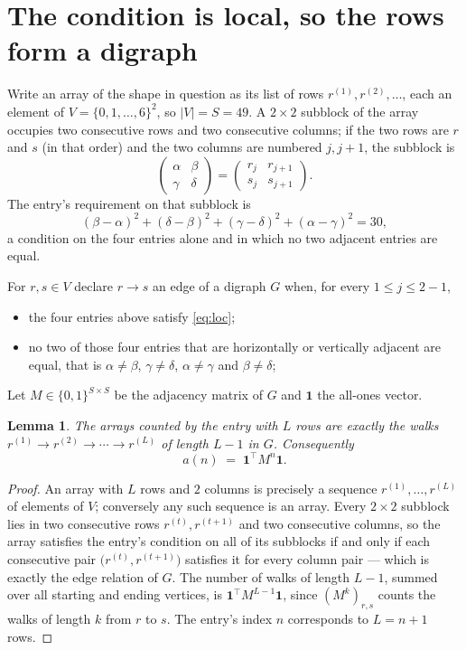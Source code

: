 \documentclass[11pt,a4paper]{article}
\theoremstyle{plain}
\newtheorem{lemma}[theorem]{Lemma}
\theoremstyle{definition}
\begin{document}
\section{The condition is local, so the rows form a digraph}

Write an array of the shape in question as its list of rows
$r^{(1)},r^{(2)},\dots$, each an element of
$V=\{0,1,\dots,6\}^{2}$, so $|V|=S=49$. A $2\times2$ subblock of the array
occupies two consecutive rows and two consecutive columns; if the two rows are $r$
and $s$ (in that order) and the two columns are numbered $j,j+1$,
the subblock is
\[
\begin{pmatrix}\alpha&\beta\\\gamma&\delta\end{pmatrix}=\begin{pmatrix}r_j&r_{j+1}\\s_j&s_{j+1}\end{pmatrix}.
\]
The entry's requirement on that subblock is
\begin{equation}\label{eq:loc}
(\beta-\alpha)^2+(\delta-\beta)^2+(\gamma-\delta)^2+(\alpha-\gamma)^2=30,
\end{equation}
a condition on the four entries alone and in which no two adjacent entries are equal.

For $r,s\in V$ declare $r\to s$ an edge of a digraph $G$ when, for every
$1\le j\le 2-1$,
\begin{itemize}
\item the four entries above satisfy \eqref{eq:loc};
\item no two of those four entries that are horizontally or vertically adjacent are equal, that is $\alpha\ne\beta$, $\gamma\ne\delta$, $\alpha\ne\gamma$ and $\beta\ne\delta$;
\end{itemize}
Let $M\in\{0,1\}^{S\times S}$ be the adjacency matrix of $G$ and $\mathbf{1}$ the
all-ones vector.

\begin{lemma}\label{lem:walk}
The arrays counted by the entry with $L$ rows are exactly the walks
$r^{(1)}\to r^{(2)}\to\cdots\to r^{(L)}$ of length $L-1$ in $G$. Consequently
\[
a(n)\;=\;\mathbf{1}^{\!\top}M^{n}\mathbf{1} .
\]
\end{lemma}

\begin{proof}
An array with $L$ rows and $2$ columns is precisely a sequence
$r^{(1)},\dots,r^{(L)}$ of elements of $V$; conversely any such sequence is an array.
Every $2\times2$ subblock lies in two consecutive rows $r^{(t)},r^{(t+1)}$ and two
consecutive columns, so the array satisfies the entry's condition on all of its subblocks
if and only if each consecutive pair $\bigl(r^{(t)},r^{(t+1)}\bigr)$ satisfies it for
every column pair --- which is exactly the edge relation of $G$. The number of walks of
length $L-1$, summed over all starting and ending vertices, is
$\mathbf{1}^{\!\top}M^{L-1}\mathbf{1}$, since $(M^{k})_{r,s}$ counts the walks of
length $k$ from $r$ to $s$. The entry's index $n$ corresponds to $L=n+1$ rows.
\end{proof}
\end{document}
